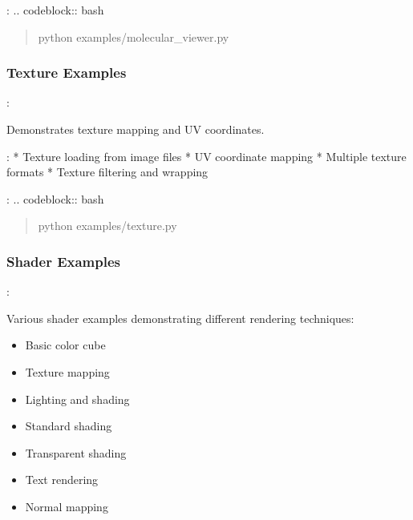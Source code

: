 \documentclass[a4paper,10pt,english,openany,oneside]{sphinxmanual}
\begin{document}
\sphinxAtStartPar
{}:
.. code\sphinxhyphen{}block:: bash
\begin{quote}

\sphinxAtStartPar
python examples/molecular\_viewer.py
\end{quote}


\subsubsection{Texture Examples}
\label{\detokenize{examples:texture-examples}}
\sphinxAtStartPar
{}: 

\sphinxAtStartPar
Demonstrates texture mapping and UV coordinates.

\sphinxAtStartPar
{}:
* Texture loading from image files
* UV coordinate mapping
* Multiple texture formats
* Texture filtering and wrapping

\sphinxAtStartPar
{}:
.. code\sphinxhyphen{}block:: bash
\begin{quote}

\sphinxAtStartPar
python examples/texture.py
\end{quote}


\subsubsection{Shader Examples}
\label{\detokenize{examples:shader-examples}}
\sphinxAtStartPar
{}: 

\sphinxAtStartPar
Various shader examples demonstrating different rendering techniques:
\begin{itemize}
\item {} 
\sphinxAtStartPar
{} \sphinxhyphen{} Basic color cube

\item {} 
\sphinxAtStartPar
{} \sphinxhyphen{} Texture mapping

\item {} 
\sphinxAtStartPar
{} \sphinxhyphen{} Lighting and shading

\item {} 
\sphinxAtStartPar
{} \sphinxhyphen{} Standard shading

\item {} 
\sphinxAtStartPar
{} \sphinxhyphen{} Transparent shading

\item {} 
\sphinxAtStartPar
{} \sphinxhyphen{} Text rendering

\item {} 
\sphinxAtStartPar
{} \sphinxhyphen{} Normal mapping

\end{itemize}
\end{document}
